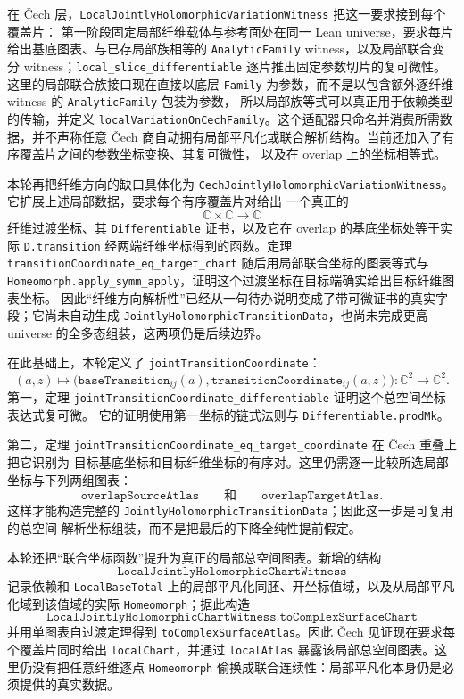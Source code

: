 \documentclass[UTF8,fontset=none,a4paper,11pt]{ctexart}
\begin{document}
在 Čech 层，\texttt{LocalJointlyHolomorphicVariationWitness} 把这一要求接到每个覆盖片：
第一阶段固定局部纤维载体与参考面处在同一 Lean universe，要求每片给出基底图表、与已存局部族相等的
\texttt{AnalyticFamily} witness，以及局部联合变分 witness；\texttt{local\_slice\_differentiable}
逐片推出固定参数切片的复可微性。这里的局部联合族接口现在直接以底层
\texttt{Family} 为参数，而不是以包含额外逐纤维 witness 的 \texttt{AnalyticFamily} 包装为参数，
所以局部族等式可以真正用于依赖类型的传输，并定义
\texttt{localVariationOnCechFamily}。这个适配器只命名并消费所需数据，并不声称任意 Čech
商自动拥有局部平凡化或联合解析结构。当前还加入了有序覆盖片之间的参数坐标变换、其复可微性，
以及在 overlap 上的坐标相等式。

本轮再把纤维方向的缺口具体化为
\texttt{CechJointlyHolomorphicVariationWitness}。它扩展上述局部数据，要求每个有序覆盖片对给出
一个真正的
\[
  \mathbb C\times\mathbb C\longrightarrow\mathbb C
\]
纤维过渡坐标、其 \texttt{Differentiable} 证书，以及它在 overlap 的基底坐标处等于实际
\texttt{D.transition} 经两端纤维坐标得到的函数。定理
\texttt{transitionCoordinate\_eq\_target\_chart} 随后用局部联合坐标的图表等式与
\texttt{Homeomorph.apply\_symm\_apply}，证明这个过渡坐标在目标端确实给出目标纤维图表坐标。
因此“纤维方向解析性”已经从一句待办说明变成了带可微证书的真实字段；它尚未自动生成
\texttt{JointlyHolomorphicTransitionData}，也尚未完成更高 universe 的全多态组装，这两项仍是后续边界。

在此基础上，本轮定义了
\texttt{jointTransitionCoordinate}：
\[
 (a,z)\longmapsto
 \bigl(\texttt{baseTransition}_{ij}(a),
       \texttt{transitionCoordinate}_{ij}(a,z)\bigr)
 \colon \mathbb C^2\longrightarrow\mathbb C^2 .
\]
第一，定理
\texttt{jointTransitionCoordinate\_differentiable} 证明这个总空间坐标表达式复可微。
它的证明使用第一坐标的链式法则与 \texttt{Differentiable.prodMk}。

第二，定理
\texttt{jointTransitionCoordinate\_eq\_target\_coordinate} 在 Čech 重叠上把它识别为
目标基底坐标和目标纤维坐标的有序对。这里仍需逐一比较所选局部坐标与下列两组图表：
\[
\texttt{overlapSourceAtlas}
\qquad\text{和}\qquad
\texttt{overlapTargetAtlas}.
\]
这样才能构造完整的 \texttt{JointlyHolomorphicTransitionData}；因此这一步是可复用的总空间
解析坐标组装，而不是把最后的下降全纯性提前假定。

本轮还把“联合坐标函数”提升为真正的局部总空间图表。新增的结构
\[
\texttt{LocalJointlyHolomorphicChartWitness}
\]
记录依赖和 \texttt{LocalBaseTotal} 上的局部平凡化同胚、开坐标值域，以及从局部平凡化域到该值域的实际
\texttt{Homeomorph}；据此构造
\[
\texttt{LocalJointlyHolomorphicChartWitness.toComplexSurfaceChart}
\]
并用单图表自过渡定理得到 \texttt{toComplexSurfaceAtlas}。因此 Čech 见证现在要求每个覆盖片同时给出
\texttt{localChart}，并通过 \texttt{localAtlas} 暴露该局部总空间图表。这里仍没有把任意纤维逐点
\texttt{Homeomorph} 偷换成联合连续性：局部平凡化本身仍是必须提供的真实数据。
\end{document}

